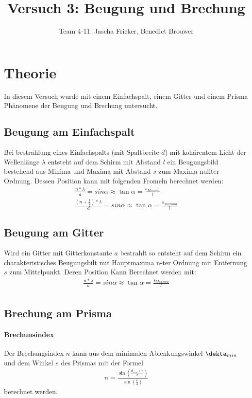 \documentclass[11pt, a4paper]{article}
\title{Versuch 3: Beugung und Brechung}
\author{Team 4-11: Jascha Fricker, Benedict Brouwer}
\begin{document}
    \maketitle

    \tableofcontents

    \newpage

    \section{Theorie}
    \FloatBarrier
    In diesem Versuch wurde mit einem Einfachspalt, einem Gitter und einem Prisma Phänomene der Beugung und Brechung untersucht. 

    \subsection{Beugung am Einfachspalt}
    Bei bestrahlung eines Einfachspalts (mit Spaltbreite $d$) mit kohärentem Licht der Wellenlänge $\lambda$ entsteht auf dem Schirm mit Abstand $l$ ein Beugungsbild bestehend aus Minima und Maxima mit Abstand $s$ zum Maxima nullter Ordnung. Dessen Position kann mit folgenden Fromeln berechnet werden:
    \begin{align}
        \frac{n * \lambda}{d} = sin{\alpha} \approx \tan{\alpha} = \frac{s_{Minima}}{l} \label{eq:einfachspalt} \\
        \frac{(n + \frac{1}{2})* \lambda}{d} = sin{\alpha} \approx \tan{\alpha} = \frac{s_{Maxima}}{l} 
    \end{align}
    \subsection{Beugung am Gitter}
    Wird ein Gitter mit Gitterkonstante $a$ bestrahlt so entsteht auf dem Schirm ein charakteristisches Beugungsbilt mit Hauptmaxima n-ter Ordnung mit Entfernung $s$ zum Mittelpunkt. Deren Position Kann Berechnet werden mit:
    \begin{align}
        \frac{n * \lambda}{a} = sin{\alpha} \approx \tan{\alpha} = \frac{s_{Maxima}}{l} \label{eq:Gitter} \\
    \end{align}

    \subsection{Brechung am Prisma}

    \paragraph{Brechunsindex}
    Der Brechungsindex $n$ kann aus dem minimalen Ablenkungswinkel $\dekta_{min}$ und dem Winkel $e$ des Prismas mit der Formel
    \begin{align}
        n = \frac{\sin\left(\frac{d_{min} + e}{2}\right)}{\sin\left(\frac{e}{2}\right)} \label{eq:brechungsindex}
    \end{align}
    berechnet werden.
    
\end{document}
